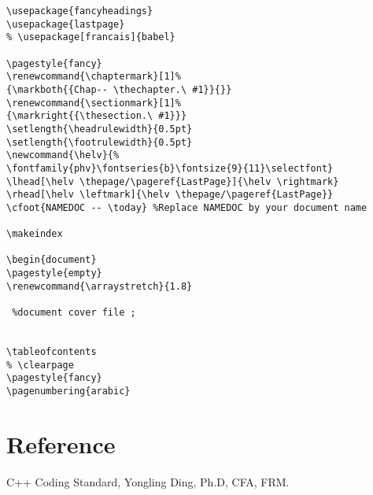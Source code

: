 \documentclass[a4paper,twoside,openright,makeidx,12pt]{report}
\renewcommand{\chaptermark}[1]%
{\markboth{{Chap-- \thechapter.\ #1}}{}}
\renewcommand{\sectionmark}[1]%
{\markright{{\thesection.\ #1}}}
\newcommand{\helv}{%
  \fontfamily{phv}\fontseries{b}\fontsize{9}{11}\selectfont}
\begin{document}
\begin{verbatim}



\usepackage{fancyheadings} 
\usepackage{lastpage}
% \usepackage[francais]{babel}
 
\pagestyle{fancy} 
\renewcommand{\chaptermark}[1]% 
{\markboth{{Chap-- \thechapter.\ #1}}{}} 
\renewcommand{\sectionmark}[1]% 
{\markright{{\thesection.\ #1}}} 
\setlength{\headrulewidth}{0.5pt} 
\setlength{\footrulewidth}{0.5pt} 
\newcommand{\helv}{% 
\fontfamily{phv}\fontseries{b}\fontsize{9}{11}\selectfont} 
\lhead[\helv \thepage/\pageref{LastPage}]{\helv \rightmark} 
\rhead[\helv \leftmark]{\helv \thepage/\pageref{LastPage}} 
\cfoot{NAMEDOC -- \today} %Replace NAMEDOC by your document name

\makeindex

\begin{document}
\pagestyle{empty}
\renewcommand{\arraystretch}{1.8}

 %document cover file ; 


\tableofcontents
% \clearpage
\pagestyle{fancy}
\pagenumbering{arabic}
\end{verbatim}


\clearpage
\chapter{Reference} 
C++ Coding Standard, Yongling Ding, Ph.D, CFA, FRM.


\cleardoublepage
\end{document}
